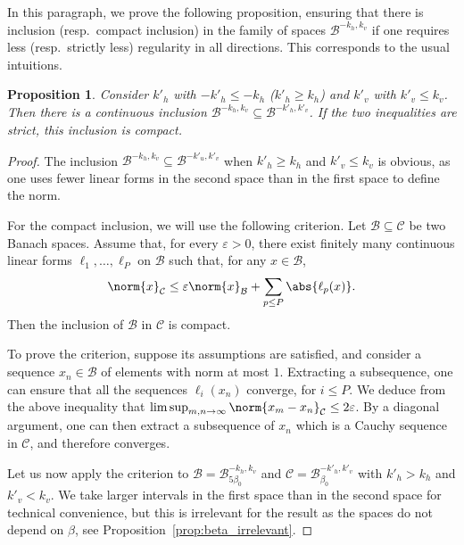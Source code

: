\documentclass[10pt]{amsart}
\newcommand{\boC}{\mathcal{C}}
\newcommand{\boB}{\mathcal{B}}
\let\epsilon\varepsilon
\newtheorem{prop}[thm]{Proposition}
\theoremstyle{definition}
\numberwithin{equation}{section}
\begin{document}
In this paragraph, we prove the following proposition, ensuring that there
is inclusion (resp.\ compact inclusion) in the family of spaces $\boB^{-k_h, k_v}$
if one requires less (resp.\ strictly less) regularity in all directions.
This corresponds to the usual intuitions.

\begin{prop}
\label{prop:compact_inclusion} Consider $k'_h$ with $-k'_h \leq -k_h$ (\ie $k'_h \geq k_h$) and $k'_v$ with $k'_v \leq k_v$. Then there is a continuous
inclusion $\boB^{-k_h, k_v} \subseteq \boB^{-k'_h, k'_v}$. If the two
inequalities are strict, this inclusion is compact.
\end{prop}
\begin{proof}
The inclusion $\boB^{-k_h, k_v} \subseteq \boB^{-k'_u, k'_v}$ when $k'_h \geq
k_h$ and $k'_v \leq k_v$ is obvious, as one uses fewer linear forms in the
second space than in the first space to define the norm.

For the compact inclusion, we will use the following criterion. Let $\boB
\subseteq \boC$ be two Banach spaces. Assume that, for every $\epsilon>0$,
there exist finitely many continuous linear forms $\ell_1,\dotsc,\ell_P$ on
$\boB$ such that, for any $x \in \boB$,
\begin{equation}
\label{eq:critere_compacite}
\norm{x}_{\boC} \leq \epsilon \norm{x}_{\boB} + \sum_{p \leq P} \abs{\ell_p(x)}.
\end{equation}
Then the inclusion of $\boB$ in $\boC$ is compact.

To prove the criterion, suppose its assumptions are satisfied, and consider a
sequence $x_n \in \boB$ of elements with norm at most $1$. Extracting a
subsequence, one can ensure that all the sequences $\ell_i(x_n)$ converge,
for $i\leq P$. We deduce from the above inequality that $\limsup_{m,n\to
\infty} \norm{x_m -x_n}_{\boC} \leq 2 \epsilon$. By a diagonal argument, one
can then extract a subsequence of $x_n$ which is a Cauchy sequence in $\boC$,
and therefore converges.

Let us now apply the criterion to $\boB = \boB^{-k_h, k_v}_{5\beta_0}$ and
$\boC = \boB^{-k'_h, k'_v}_{\beta_0}$ with $k'_h>k_h$ and $k'_v<k_v$. We take
larger intervals in the first space than in the second space for technical
convenience, but this is irrelevant for the result as the spaces do not
depend on $\beta$, see Proposition~\ref{prop:beta_irrelevant}.


\end{proof}
\end{document}
